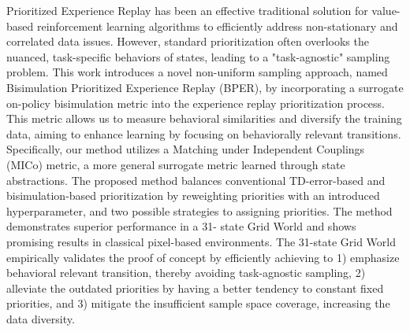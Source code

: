 Prioritized Experience Replay has been an effective traditional solution for value-based reinforcement learning algorithms to efficiently address non-stationary and correlated data issues. However, standard prioritization often overlooks the nuanced, task-specific behaviors of states, leading to a "task-agnostic" sampling problem. This work introduces a novel non-uniform sampling approach, named Bisimulation Prioritized Experience Replay (BPER), by incorporating a surrogate on-policy bisimulation metric into the experience replay prioritization process. This metric allows us to measure behavioral similarities and diversify the training data, aiming to enhance learning by focusing on behaviorally relevant transitions. Specifically, our method utilizes a Matching under Independent Couplings (MICo) metric, a more general surrogate metric learned through state abstractions. The proposed method balances conventional TD-error-based and bisimulation-based prioritization by reweighting priorities with an introduced hyperparameter, and two possible strategies to assigning priorities. The method demonstrates superior performance in a 31-
state Grid World and shows promising results in classical pixel-based environments. The 31-state Grid World empirically validates the proof of concept by efficiently achieving to 1) emphasize behavioral relevant transition, thereby avoiding task-agnostic sampling, 2) alleviate the outdated priorities by having a better tendency to constant fixed priorities, and 3) mitigate the insufficient sample space coverage, increasing the data diversity.



